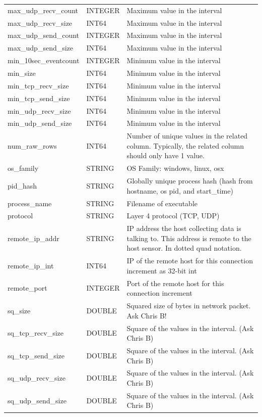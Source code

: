 \documentclass[conference,compsoc]{IEEEtran}
\begin{document}
\begin{longtable}{|p{5cm}|p{2cm}|p{9cm}|}
max\_udp\_recv\_count & INTEGER & Maximum value in the interval \\
max\_udp\_recv\_size & INT64 & Maximum value in the interval \\
max\_udp\_send\_count & INTEGER & Maximum value in the interval \\
max\_udp\_send\_size & INT64 & Maximum value in the interval \\
min\_10sec\_eventcount & INTEGER & Minimum value in the interval \\
min\_size & INT64 & Minimum value in the interval \\
min\_tcp\_recv\_size & INT64 & Minimum value in the interval \\
min\_tcp\_send\_size & INT64 & Minimum value in the interval \\
min\_udp\_recv\_size & INT64 & Minimum value in the interval \\
min\_udp\_send\_size & INT64 & Minimum value in the interval \\
num\_raw\_rows & INT64 & Number of unique values in the related column. Typically, the related column should only have 1 value. \\
os\_family & STRING & OS Family: windows, linux, osx \\
pid\_hash & STRING & Globally unique process hash (hash from hostname, os pid, and start\_time) \\
process\_name & STRING & Filename of executable \\
protocol & STRING & Layer 4 protocol (TCP, UDP) \\
remote\_ip\_addr & STRING & IP address the host collecting data is talking to. This address is remote to the host sensor. In dotted quad notation. \\
remote\_ip\_int & INT64 & IP of the remote host for this connection increment as 32-bit int \\
remote\_port & INTEGER & Port of the remote host for this connection increment \\
sq\_size & DOUBLE & Squared size of bytes in network packet. Ask Chris B! \\
sq\_tcp\_recv\_size & DOUBLE & Square of the values in the interval. (Ask Chris B) \\
sq\_tcp\_send\_size & DOUBLE & Square of the values in the interval. (Ask Chris B) \\
sq\_udp\_recv\_size & DOUBLE & Square of the values in the interval. (Ask Chris B) \\
sq\_udp\_send\_size & DOUBLE & Square of the values in the interval. (Ask Chris B) \\

\end{longtable}
\end{document}

